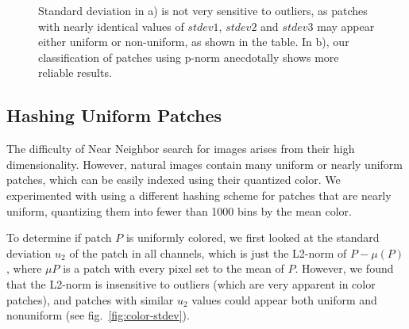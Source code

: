\begin{figure}[ht!]
\caption{Standard deviation in a) is not very sensitive
to outliers, as patches with nearly identical
values of $stdev1$, $stdev2$ and $stdev3$ may appear
either uniform or non-uniform, as shown in the table.
In b), our classification of patches using
p-norm anecdotally shows more reliable results.}
\end{figure}

\subsection{Hashing Uniform Patches}\label{ssec:uni-nn}

The difficulty of Near Neighbor search for images arises from
their high dimensionality. However, natural images contain many uniform
or nearly uniform patches, which can be easily indexed using
their quantized color. We experimented with using a different
hashing scheme for patches that are nearly uniform, quantizing
them into fewer than 1000 bins by the mean color.

To determine if patch $P$ is uniformly colored, we first
looked at the standard deviation $u_2$ of the patch in all channels, which is
just the L2-norm of $P-\mu(P)$, where $\mu{P}$ is a patch
with every pixel set to the mean of $P$.
However, we found that the L2-norm is insensitive to outliers
(which are very apparent in color patches),
and patches with similar $u_2$ values could appear both uniform
and nonuniform (see fig.~\ref{fig:color-stdev}).


